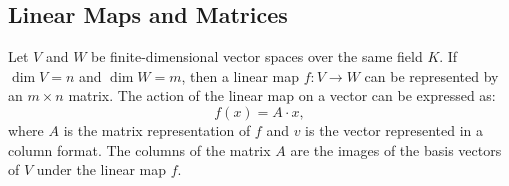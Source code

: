 \subsection{Linear Maps and Matrices}
 Let \( V \) and \( W \) be finite-dimensional vector spaces over the same field \( K \). If \( \dim V = n \) and \( \dim W = m \), then a linear map \( f: V \to W \) can be represented by an \( m \times n \) matrix. The action of the linear map on a vector can be expressed as:
\[
f(x) = A \cdot x,
\]
where \( A \) is the matrix representation of \( f \) and \( v \) is the vector represented in a column format. The columns of the matrix \( A \) are the images of the basis vectors of \( V \) under the linear map \( f \).

